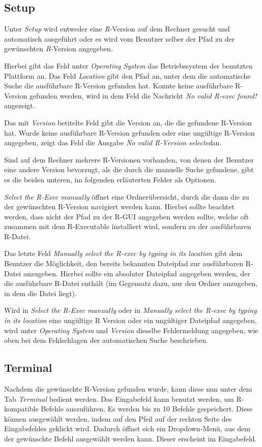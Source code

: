 \documentclass[a4paper, 12pt]{report} %
\begin{document}
\subsection{Setup} \label{Setup}
Unter \textit{Setup} wird entweder eine \textit{R}-Version auf dem Rechner gesucht und automatisch ausgeführt oder es wird vom Benutzer selber der Pfad zu der gewünschten \textit{R}-Version angegeben. 

Hierbei gibt das Feld unter \textit{Operating System} das Betriebssystem der benutzten Plattform an. Das Feld \textit{Location} gibt den Pfad an, unter dem die automatische Suche die ausführbare R-Version gefunden hat. Konnte keine ausführbare R-Version gefunden werden, wird in dem Feld die Nachricht \textit{No valid R-exec found!} angezeigt. 

Das mit \textit{Version} betitelte Feld gibt die Version an, die die gefundene R-Version hat. Wurde keine ausführbare R-Version gefunden oder eine ungültige R-Version angegeben, zeigt das Feld die Ausgabe \textit{No valid R-Version selected}an. 

Sind auf dem Rechner mehrere R-Versionen vorhanden, von denen der Benutzer eine andere Version bevorzugt, als die durch die manuelle Suche gefundene, gibt es die beiden unteren, im folgenden erläuterten Felder als Optionen. 

\textit{Select the R-Exec manually} öffnet eine Ordnerübersicht, durch die dann die zu der gewünschten R-Version navigiert werden kann. Hierbei sollte beachtet werden, dass nicht der Pfad zu der R-GUI angegeben werden sollte, welche oft zusammen mit dem R-Executable installiert wird, sondern zu der ausführbaren R-Datei.
  
Das letzte Feld \textit{Manually select the R-exec by typing in its location} gibt dem Benutzer die Möglichkeit, den bereits bekannten Dateipfad zur ausführbaren R-Datei anzugeben. Hierbei sollte ein absoluter Dateipfad angegeben werden, der die ausführbare R-Datei enthält (im Gegensatz dazu, nur den Ordner anzugeben, in dem die Datei liegt). 

Wird in \textit{Select the R-Exec manually} oder in \textit{Manually select the R-exec by typing in its location} eine ungültige R Version oder ein ungültiger Dateipfad angegeben, wird unter \textit{Operating System} und \textit{Version} dieselbe Fehlermeldung angegeben, wie oben bei dem Fehlschlagen der automatischen Suche beschrieben. 

\subsection{Terminal} \label{Terminal}
Nachdem die gewünschte R-Version gefunden wurde, kann diese nun unter dem Tab \textit{Terminal} bedient werden. Das Eingabefeld kann benutzt werden, um R-kompatible Befehle auszuführen. Es werden bis zu 10 Befehle gespeichert. Diese können ausgewählt werden, indem auf den Pfeil auf der rechten Seite des Eingabefeldes geklickt wird. Dadurch öffnet sich ein Dropdown-Menü, aus dem der gewünschte Befehl ausgewählt werden kann. Dieser erscheint im Eingabefeld. 
\end{document}
